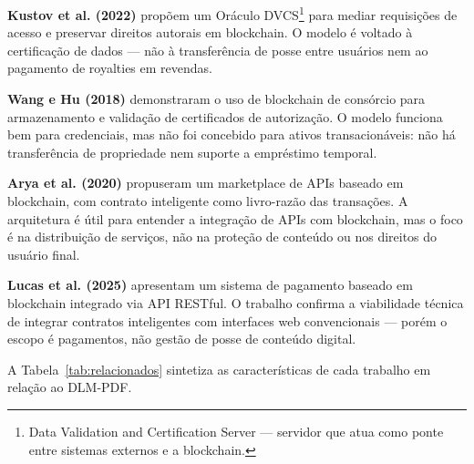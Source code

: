 \documentclass[12pt]{article}
\begin{document}
\textbf{Kustov et al. (2022)} propõem um Oráculo DVCS\footnote{Data Validation and Certification Server — servidor que atua como ponte entre sistemas externos e a blockchain.} para mediar requisições de acesso e preservar direitos autorais em blockchain. O modelo é voltado à certificação de dados — não à transferência de posse entre usuários nem ao pagamento de royalties em revendas.

\textbf{Wang e Hu (2018)} demonstraram o uso de blockchain de consórcio para armazenamento e validação de certificados de autorização. O modelo funciona bem para credenciais, mas não foi concebido para ativos transacionáveis: não há transferência de propriedade nem suporte a empréstimo temporal.

\textbf{Arya et al. (2020)} propuseram um marketplace de APIs baseado em blockchain, com contrato inteligente como livro-razão das transações. A arquitetura é útil para entender a integração de APIs com blockchain, mas o foco é na distribuição de serviços, não na proteção de conteúdo ou nos direitos do usuário final.

\textbf{Lucas et al. (2025)} apresentam um sistema de pagamento baseado em blockchain integrado via API RESTful. O trabalho confirma a viabilidade técnica de integrar contratos inteligentes com interfaces web convencionais — porém o escopo é pagamentos, não gestão de posse de conteúdo digital.

A Tabela~\ref{tab:relacionados} sintetiza as características de cada trabalho em relação ao DLM-PDF.
\end{document}
